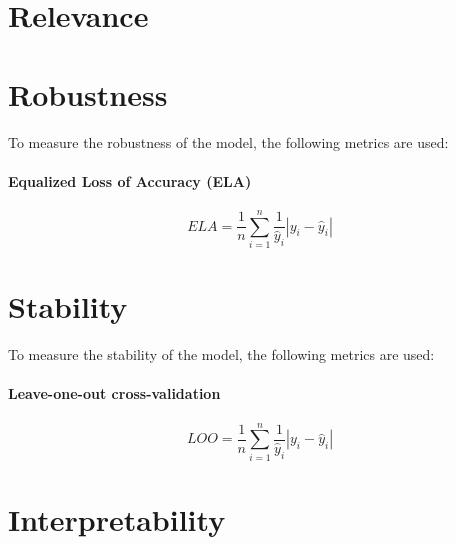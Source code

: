 \section{Relevance}



\section{Robustness}


To measure the robustness of the model, the following metrics are used:

\paragraph*{Equalized Loss of Accuracy (ELA)}

\begin{equation}
    \label{eq:ela}
    ELA = \frac{1}{n} \sum_{i=1}^{n} \frac{1}{\hat{y}_i} |y_i - \hat{y}_i|
\end{equation}



\section{Stability}

To measure the stability of the model, the following metrics are used:

\paragraph*{Leave-one-out cross-validation}

\begin{equation}
    \label{eq:loo}
    LOO = \frac{1}{n} \sum_{i=1}^{n} \frac{1}{\hat{y}_i} |y_i - \hat{y}_i|
\end{equation}


\section{Interpretability}

